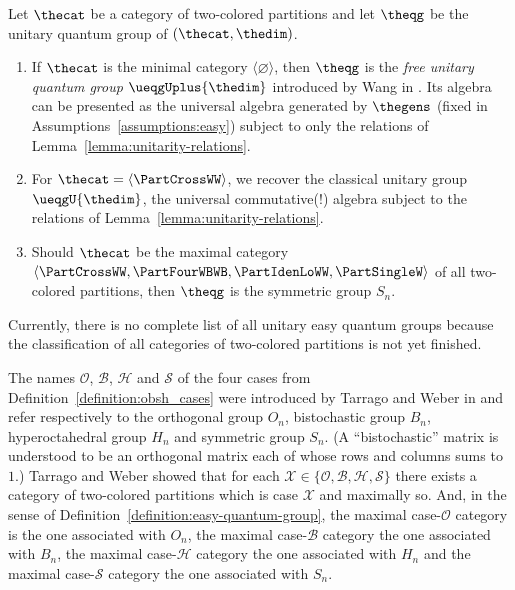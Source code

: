 \documentclass[pdftex]{sigma}
\numberwithin{equation}{section}
\begin{document}
\begin{Example}
  Let $\thecat$ be a category of two-co\-lo\-red partitions and let $\theqg$ be the unitary quantum group of $(\thecat,\thedim)$.
  \begin{enumerate}
    \item If $\thecat$ is the minimal category $\langle \varnothing\rangle$, then $\theqg$ is the \emph{free unitary quantum group} $\ueqgUplus{\thedim}$ introduced by Wang in \cite{Wang1995b}. Its algebra can be presented as the universal algebra generated by $\thegens$ (fixed in Assumptions~\ref{assumptions:easy}) subject to only the relations of Lem\-ma~\ref{lemma:unitarity-relations}.
  \item For $\thecat=\langle \PartCrossWW\rangle$, we recover the classical unitary group $\ueqgU{\thedim}$, the universal commutative(!) algebra subject to the relations of Lem\-ma~\ref{lemma:unitarity-relations}.
          \item Should $\thecat$ be the maximal category $\langle \PartCrossWW,\PartFourWBWB,\PartIdenLoWW,\PartSingleW\rangle$ of all two-co\-lo\-red partitions, then $\theqg$ is the symmetric group $S_n$.
  \end{enumerate}
\end{Example}
Currently, there is no complete list of all unitary easy quantum groups because the classification of all categories of two-co\-lo\-red partitions is not yet finished.
\begin{Remark}
  \label{remark:obsh_cases}
  \newcommand{\anyblock}{\Yb{B}}
  \newcommand{\anypartition}{p}
  \newcommand{\anycat}{\mathcal{C}}
  \newcommand{\incol}{\Yc{c}}
  \newcommand{\outcol}{\Yc{d}}
  \newcommand{\anyset}{\mathcal{S}}
  \newcommand{\anygroup}{G_n}
  \newcommand{\dummycase}{\mathcal{X}}
  The names $\mathcal{O}$, $\mathcal{B}$, $\mathcal{H}$ and $\mathcal{S}$ of the four cases from Definition~\ref{definition:obsh_cases} were introduced by Tarrago and Weber in \cite[Definition~2.2]{TarragoWeber2018} and refer respectively to the orthogonal group $O_n$, bistochastic group $B_n$, hyperoctahedral group $H_n$ and symmetric group $S_n$. (A ``bistochastic'' matrix is understood to be an orthogonal matrix each of whose rows and columns  sums to $1$.) Tarrago and Weber showed that for each $\dummycase\in \{\mathcal{O},\mathcal{B},\mathcal{H},\mathcal{S}\}$ there exists a category of two-colored partitions which is  case $\dummycase$ and maximally so. And, in the sense of Definition~\ref{definition:easy-quantum-group}, the maximal case-$\mathcal{O}$ category is the one associated with $O_n$, the maximal case-$\mathcal{B}$ category the one associated with $B_n$, the maximal case-$\mathcal{H}$ category the one associated with $H_n$ and the maximal case-$\mathcal{S}$ category the one associated with $S_n$.
\end{Remark}
\end{document}
